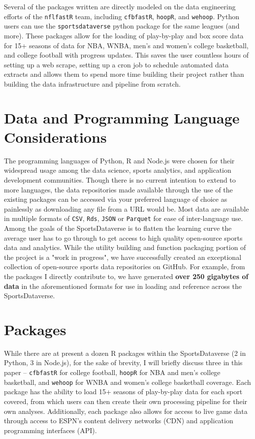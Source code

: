 \documentclass[12pt]{article}
\begin{document}
Several of the packages written are directly modeled on the data engineering efforts of the \texttt{nflfastR} team, including \texttt{cfbfastR}\cite{gilani_etal_cfbfastr_2021}, \texttt{hoopR}\cite{gilani_hoopR_2021}, and \texttt{wehoop}\cite{hutchinson_gilani_2021}. Python users can use the \texttt{sportsdataverse} python package for the same leagues (and more)\cite{gilani_sportsdataversepy_2021}. These packages allow for the loading of play-by-play and box score data for 15+ seasons of data for NBA, WNBA, men's and women's college basketball, and college football with progress updates. This saves the user countless hours of setting up a web scrape, setting up a cron job to schedule automated data extracts and allows them to spend more time building their project rather than building the data infrastructure and pipeline from scratch.  

\section{Data and Programming Language Considerations}
The programming languages of Python, R and Node.js were chosen for their widespread usage among the data science, sports analytics, and application development communities. Though there is no current intention to extend to more languages, the data repositories made available through the use of the existing packages can be accessed via your preferred language of choice as painlessly as downloading any file from a URL would be. Most data are available in multiple formats of \texttt{CSV}, \texttt{Rds}, \texttt{JSON} or \texttt{Parquet} for ease of inter-language use. Among the goals of the SportsDataverse is to flatten the learning curve the average user has to go through to get access to high quality open-source sports data and analytics. While the utility building and function packaging portion of the project is a "work in progress", we have successfully created an exceptional collection of open-source sports data repositories on GitHub. For example, from the packages I directly contribute to, we have generated \textbf{over 250 gigabytes of data} in the aforementioned formats for use in loading and reference across the SportsDataverse. 

\section{Packages}
While there are at present a dozen R packages within the SportsDataverse (2 in Python, 3 in Node.js), for the sake of brevity, I will briefly discuss three in this paper -- \texttt{cfbfastR} for college football, \texttt{hoopR} for NBA and men's college basketball, and \texttt{wehoop} for WNBA and women's college basketball coverage. Each package has the ability to load 15+ seasons of play-by-play data for each sport covered, from which users can then create their own processing pipeline for their own analyses. Additionally, each package also allows for access to live game data through access to ESPN's content delivery networks (CDN) and application programming interfaces (API). 
\end{document}
